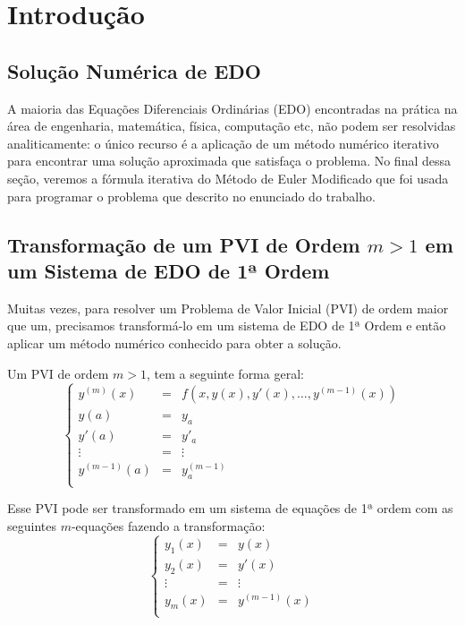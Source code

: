 \section{Introdução}

\subsection{Solução Numérica de EDO}

A maioria das Equações Diferenciais Ordinárias (EDO) encontradas na prática na área de engenharia,
matemática, física, computação etc, não podem ser resolvidas analiticamente: o único recurso é a
aplicação de um método numérico iterativo para encontrar uma solução aproximada que satisfaça o problema.
No final dessa seção, veremos a fórmula iterativa do Método de Euler Modificado que foi usada para
programar o problema que descrito no enunciado do trabalho.

\subsection{Transformação de um PVI de Ordem $m > 1$ em um Sistema de EDO de 1ª Ordem}

Muitas vezes, para resolver um Problema de Valor Inicial (PVI) de ordem maior que um,
precisamos transformá-lo em um sistema de EDO de 1ª Ordem e então aplicar um método
numérico conhecido para obter a solução.

Um PVI de ordem $m > 1$, tem a seguinte forma geral:
\[
	\left \{
		\begin{array}{lllll}
			y^{(m)}(x)   & = & f(x, y(x), y'(x), \dots, y^{(m-1)}(x)) \\
			y(a)         & = & y_{a} \\
			y'(a)        & = & y'_{a} \\
			\vdots      & = & \vdots \\
			y^{(m-1)}(a) & = & y^{(m-1)}_{a} \\
		\end{array}
	\right .
\]

Esse PVI pode ser transformado em um sistema de equações de 1ª ordem com as
seguintes $m$-equações fazendo a transformação:
\[
	\left \{
		\begin{array}{lllll}
			y_{1}(x) & = & y(x) \\
			y_{2}(x) & = & y'(x) \\
			\vdots  & = & \vdots \\
			y_{m}(x) & = & y^{(m-1)}(x) \\
		\end{array}
	\right .
\]

